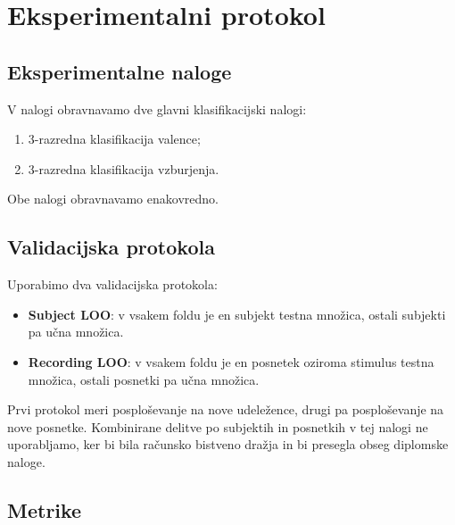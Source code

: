 \chapter{Eksperimentalni protokol}
\label{sec:eksperimenti}

\section{Eksperimentalne naloge}
\label{subsec:eksperimentalne-naloge}

V nalogi obravnavamo dve glavni klasifikacijski nalogi:
\begin{enumerate}
    \item 3-razredna klasifikacija valence;
    \item 3-razredna klasifikacija vzburjenja.
\end{enumerate}
Obe nalogi obravnavamo enakovredno.


\section{Validacijska protokola}
\label{subsec:validacijska-protokola}

Uporabimo dva validacijska protokola:
\begin{itemize}
    \item \textbf{Subject LOO}: v vsakem foldu je en subjekt testna množica, ostali subjekti pa učna množica.
    \item \textbf{Recording LOO}: v vsakem foldu je en posnetek oziroma stimulus testna množica, ostali posnetki pa učna množica.
\end{itemize}

Prvi protokol meri posploševanje na nove udeležence, drugi pa posploševanje na nove posnetke.
Kombinirane delitve po subjektih in posnetkih v tej nalogi ne uporabljamo, ker bi bila računsko bistveno dražja in bi presegla obseg diplomske naloge.


\section{Metrike}
\label{subsec:metrike}


